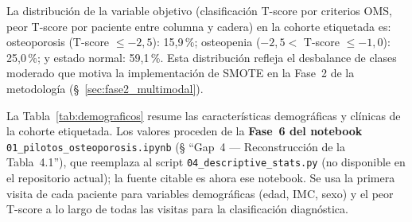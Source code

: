 \documentclass[../tesis.tex]{subfiles}
\begin{document}
La distribución de la variable objetivo (clasificación T-score por criterios OMS, peor T-score por paciente entre columna y cadera) en la cohorte etiquetada es: osteoporosis (T-score $\leq -2{,}5$): 15{,}9\,\%; osteopenia ($-2{,}5 <$ T-score $\leq -1{,}0$): 25{,}0\,\%; y estado normal: 59{,}1\,\%.
Esta distribución refleja el desbalance de clases moderado que motiva la implementación de SMOTE en la Fase~2 de la metodología (§~\ref{sec:fase2_multimodal}).

La Tabla~\ref{tab:demograficos} resume las características demográficas y clínicas de la cohorte etiquetada. Los valores proceden de la \textbf{Fase~6 del notebook} \texttt{01\_pilotos\_osteoporosis.ipynb} (§ ``Gap~4 --- Reconstrucción de la Tabla~4.1''), que reemplaza al script \texttt{04\_descriptive\_stats.py} (no disponible en el repositorio actual); la fuente citable es ahora ese notebook. Se usa la primera visita de cada paciente para variables demográficas (edad, IMC, sexo) y el peor T-score a lo largo de todas las visitas para la clasificación diagnóstica.
\end{document}
